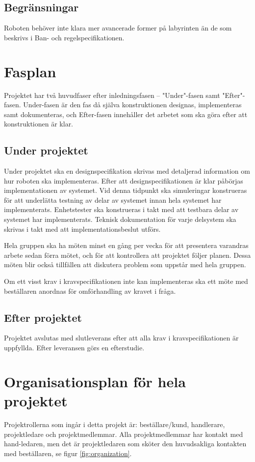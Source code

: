 \documentclass[a4paper,titlepage,12pt]{article}
\begin{document}
	
	\subsection{Begränsningar}
	Roboten behöver inte klara mer avancerade former på labyrinten än de som
	beskrivs i Ban- och regelspecifikationen.
	
	
	\section{Fasplan}
    Projektet har två huvudfaser efter inledningsfasen -- "Under"-fasen samt
    "Efter"-fasen. Under-fasen är den fas då själva konstruktionen designas, 
    implementeras samt dokumenteras, och Efter-fasen innehåller det arbetet som
    ska göra efter att konstruktionen är klar.
	
	\subsection{Under projektet}
	Under projektet ska en designspecifikation skrivas med detaljerad
	information om hur roboten ska implementeras. Efter att
	designspecifikationen är klar påbörjas implementationen av systemet. Vid
    denna tidpunkt ska simuleringar konstrueras för att underlätta testning av
    delar av systemet innan hela systemet har implementerats.
	Enhetstester ska konstrueras i takt med att testbara delar av systemet har
	implementerats. Teknisk dokumentation för varje delsystem ska skrivas
	i takt med att implementationsbeslut utförs.

	Hela gruppen ska ha möten minst en gång per vecka för att presentera
	varandras arbete sedan förra mötet, och för att kontrollera att projektet
	följer planen. Dessa möten blir också tillfällen att diskutera problem som
	uppstår med hela gruppen.

	Om ett visst krav i kravspecifikationen inte kan implementeras ska ett möte
	med beställaren anordnas för omförhandling av kravet i fråga.
	
	\subsection{Efter projektet}
	Projektet avslutas med slutleverans efter att alla krav i
	kravspecifikationen är uppfyllda. Efter leveransen görs en efterstudie.
	
	
	\section{Organisationsplan för hela projektet}
	Projektrollerna som ingår i detta projekt är: beställare/kund, handlerare,
	projektledare och projektmedlemmar. Alla projektmedlemmar har kontakt med
	hand-ledaren, men det är projektledaren som sköter den huvudsakliga
	kontakten med beställaren, se figur \ref{fig:organization}.
\end{document}
